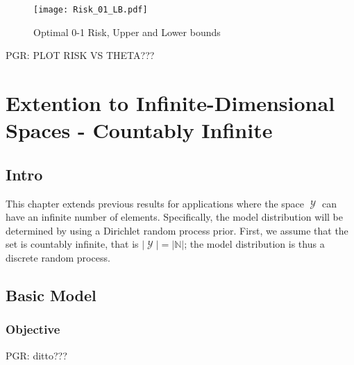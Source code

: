 \documentclass[12pt]{report}
\DeclareMathOperator{\Ycal}{\mathcal{Y}}
\begin{document}
\begin{figure}
\centering
\texttt{[image: Risk\_01\_LB.pdf]}
\caption{Optimal 0-1 Risk, Upper and Lower bounds}
\label{fig:Risk_01_LB}
\end{figure}

PGR: PLOT RISK VS THETA???







































\newpage

\chapter{Extention to Infinite-Dimensional Spaces - Countably Infinite}


\section{Intro}

This chapter extends previous results for applications where the space $\Ycal$ can have an infinite number of elements. Specifically, the model distribution will be determined by using a Dirichlet random process prior. First, we assume that the set is countably infinite, that is $|\Ycal| = |\mathbb{N}|$; the model distribution is thus a discrete random process. 




\section{Basic Model}


\subsection{Objective}

PGR: ditto???
\end{document}
